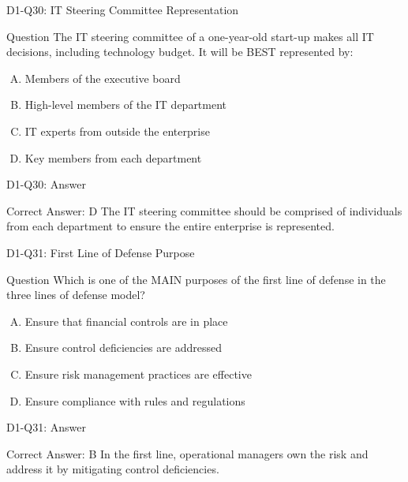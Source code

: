 \documentclass{beamer}
\begin{document}
	\begin{frame}{D1-Q30: IT Steering Committee Representation}
		\begin{block}{Question}
			The IT steering committee of a one-year-old start-up makes all IT decisions, including technology budget. It will be BEST represented by:
		\end{block}
		\begin{enumerate}[(A)]
			\item Members of the executive board
			\item High-level members of the IT department
			\item IT experts from outside the enterprise
			\item Key members from each department
		\end{enumerate}
	\end{frame}
	\begin{frame}{D1-Q30: Answer}
		\begin{block}{Correct Answer: D}
			The IT steering committee should be comprised of individuals from each department to ensure the entire enterprise is represented.
		\end{block}
	\end{frame}
	
	\begin{frame}{D1-Q31: First Line of Defense Purpose}
		\begin{block}{Question}
			Which is one of the MAIN purposes of the first line of defense in the three lines of defense model?
		\end{block}
		\begin{enumerate}[(A)]
			\item Ensure that financial controls are in place
			\item Ensure control deficiencies are addressed
			\item Ensure risk management practices are effective
			\item Ensure compliance with rules and regulations
		\end{enumerate}
	\end{frame}
	\begin{frame}{D1-Q31: Answer}
		\begin{block}{Correct Answer: B}
			In the first line, operational managers own the risk and address it by mitigating control deficiencies.
		\end{block}
	\end{frame}
	
\end{document}
